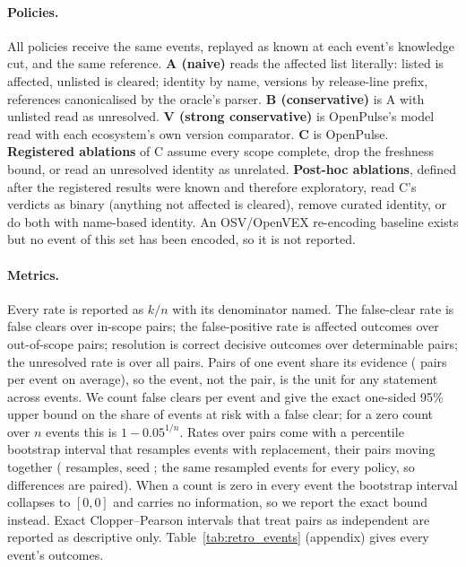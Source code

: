 \documentclass[11pt]{article}
\begin{document}
\paragraph{Policies.} All policies receive the same events, replayed as known
at each event's knowledge cut, and the same reference.
\textbf{A (naive)} reads the affected list literally: listed is affected,
unlisted is cleared; identity by name, versions by release-line prefix,
references canonicalised by the oracle's parser. \textbf{B (conservative)} is
A with unlisted read as unresolved. \textbf{V (strong conservative)} is
OpenPulse's model read with each ecosystem's own version comparator.
\textbf{C} is OpenPulse. \textbf{Registered ablations} of C assume every scope
complete, drop the freshness bound, or read an unresolved identity as
unrelated. \textbf{Post-hoc ablations}, defined after the registered results
were known and therefore exploratory, read C's verdicts as binary (anything
not affected is cleared), remove curated identity, or do both with name-based
identity. An OSV/OpenVEX re-encoding baseline exists but no event of this set
has been encoded, so it is not reported.

\paragraph{Metrics.} Every rate is reported as $k/n$ with its denominator
named. The false-clear rate is false clears over in-scope pairs; the
false-positive rate is affected outcomes over out-of-scope pairs; resolution is
correct decisive outcomes over determinable pairs; the unresolved rate is over
all pairs. Pairs of one event share its evidence (\PairsPerEvent{} pairs per
event on average), so the event, not the pair, is the unit for any statement
across events. We count false clears per event and give the exact one-sided
95\% upper bound on the share of events at risk with a false clear; for a
zero count over $n$ events this is $1-0.05^{1/n}$. Rates over pairs come with
a percentile bootstrap interval that resamples events with replacement, their
pairs moving together (\BootResamples{} resamples, seed \BootSeed{}; the same
resampled events for every policy, so differences are paired). When a count is
zero in every event the bootstrap interval collapses to $[0,0]$ and carries no
information, so we report the exact bound instead. Exact Clopper--Pearson
intervals that treat pairs as independent are reported as descriptive only.
Table~\ref{tab:retro_events} (appendix) gives every event's outcomes.
\end{document}
